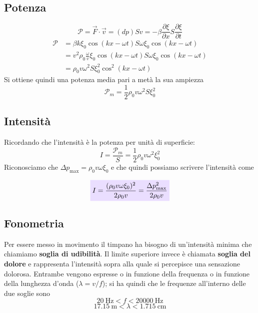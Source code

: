 \documentclass[x11names]{report}
\newcommand{\viola}[1]{\colorbox{yred}{$\displaystyle #1$}}
\begin{document}
	\subsection{Potenza}
	\[ 
	\mathcal{P} = \overrightarrow{F}\cdot \vec{v} = (dp)S v = -\beta \frac{\partial\xi}{\partial x} S \frac{\partial\xi}{\partial t}
	\]
	\begin{align*}
		\mathcal{P} &= \beta k \xi_0 \cos\left(kx- \omega t\right) S \omega  \xi_0 \cos\left(kx- \omega t\right)\\
		&= v^2\rho_0 \frac{\omega}{v} \xi_0 \cos\left(kx- \omega t\right) S \omega \xi_0 \cos\left(kx- \omega t\right)\\
		&=  \rho_0 v \omega ^2 S \xi_0^2 \cos^2\left(kx- \omega t\right) 
	\end{align*}
	Si ottiene quindi una potenza media pari a metà la sua ampiezza
	\[ 
	\mathcal{P}_m = \frac{1}{2} \rho_0 v \omega ^2 S \xi_0^2
	\]
	\subsection{Intensità}
	Ricordando che l'intensità è la potenza per unità di superficie:
	\[ 
	I = \frac{\mathcal{P}_m }{S} =   \frac{1}{2} \rho_0 v \omega ^2 \xi_0^2
	\]
	Riconosciamo che \(\Delta p_{\text{max}} = \rho_0 v \omega  \xi_0\) e che quindi possiamo scrivere l'intensità come
	
	\vspace{0.2cm}
	\begin{equation}\label{intensita_fono}
		\viola{I = \frac{(\rho_0 v \omega  \xi_0)^2}{2\rho_0 v} = \frac{\Delta p_{\text{max}}^2}{2\rho_0 v}}
	\end{equation}
	\vspace{0.2cm}
	
	\subsection{Fonometria}
	Per essere messo in movimento il timpano ha bisogno di un'intensità minima che chiamiamo \textbf{soglia di udibilità}. Il limite superiore invece è chiamata \textbf{soglia del dolore} e rappresenta l'intensità sopra alla quale si percepisce una sensazione dolorosa. Entrambe vengono espresse o in funzione della frequenza o in funzione della lunghezza d'onda (\(\lambda=v/f\)); si ha quindi che le frequenze all'interno delle due soglie sono
	\[ 
	\SI{20}{\hertz} < f < \SI{20000}{\hertz}
	\]
	\[ 
	\SI{17.15}{\m} < \lambda < \SI{1.715}{\cm}
	\]
	
\end{document}
